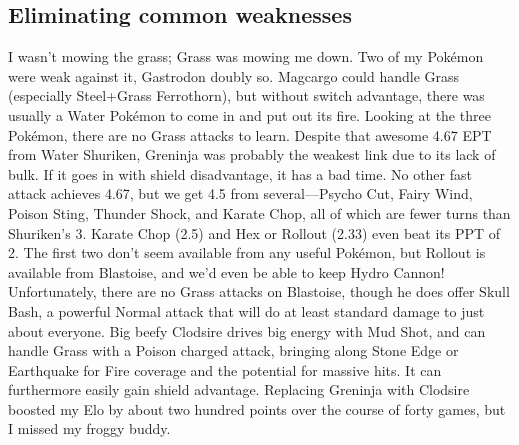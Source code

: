 \subsection{Eliminating common weaknesses\label{subsec:eliminatingweak}}
I wasn't mowing the grass; Grass was mowing me down.
Two of my Pokémon were weak against it, Gastrodon doubly so.
Magcargo could handle Grass (especially Steel+Grass Ferrothorn), but
 without switch advantage, there was usually a Water Pokémon to come
 in and put out its fire.
Looking at the three Pokémon, there are no Grass attacks to learn.
Despite that awesome 4.67 EPT from Water Shuriken, Greninja was probably
  the weakest link due to its lack of bulk.
If it goes in with shield disadvantage, it has a bad time.
No other fast attack achieves 4.67, but we get 4.5 from several---Psycho
  Cut, Fairy Wind, Poison Sting, Thunder Shock, and Karate Chop,
  all of which are fewer turns than Shuriken's 3.
Karate Chop (2.5) and Hex or Rollout (2.33) even beat its PPT of 2.
The first two don't seem available from any useful Pokémon, but
  Rollout is available from Blastoise, and we'd even be able to
  keep Hydro Cannon!
Unfortunately, there are no Grass attacks on Blastoise, though
  he does offer Skull Bash, a powerful Normal attack that
  will do at least standard damage to just about everyone.
Big beefy Clodsire drives big energy with Mud Shot, and can handle
  Grass with a Poison charged attack, bringing along Stone Edge
  or Earthquake for Fire coverage and the potential for massive hits.
It can furthermore easily gain shield advantage.
Replacing Greninja with Clodsire boosted my Elo by about two hundred points
 over the course of forty games, but I missed my froggy buddy.
